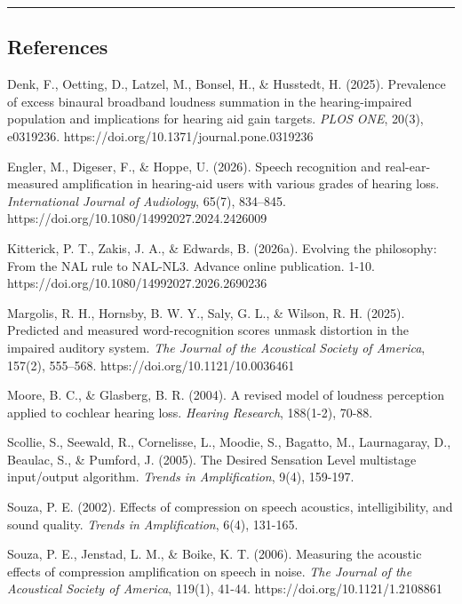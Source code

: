 \documentclass[
  12pt,
]{article}
\begin{document}
\begin{center}\rule{0.5\linewidth}{0.5pt}\end{center}

\subsection{References}\label{references-1}

Denk, F., Oetting, D., Latzel, M., Bonsel, H., \& Husstedt, H. (2025).
Prevalence of excess binaural broadband loudness summation in the
hearing-impaired population and implications for hearing aid gain
targets. \emph{PLOS ONE}, 20(3), e0319236.
https://doi.org/10.1371/journal.pone.0319236

Engler, M., Digeser, F., \& Hoppe, U. (2026). Speech recognition and
real-ear-measured amplification in hearing-aid users with various grades
of hearing loss. \emph{International Journal of Audiology}, 65(7),
834--845. https://doi.org/10.1080/14992027.2024.2426009

Kitterick, P. T., Zakis, J. A., \& Edwards, B. (2026a). Evolving the
philosophy: From the NAL rule to NAL-NL3. Advance online publication.
1-10. https://doi.org/10.1080/14992027.2026.2690236

Margolis, R. H., Hornsby, B. W. Y., Saly, G. L., \& Wilson, R. H.
(2025). Predicted and measured word-recognition scores unmask distortion
in the impaired auditory system. \emph{The Journal of the Acoustical
Society of America}, 157(2), 555--568.
https://doi.org/10.1121/10.0036461

Moore, B. C., \& Glasberg, B. R. (2004). A revised model of loudness
perception applied to cochlear hearing loss. \emph{Hearing Research},
188(1-2), 70-88.

Scollie, S., Seewald, R., Cornelisse, L., Moodie, S., Bagatto, M.,
Laurnagaray, D., Beaulac, S., \& Pumford, J. (2005). The Desired
Sensation Level multistage input/output algorithm. \emph{Trends in
Amplification}, 9(4), 159-197.

Souza, P. E. (2002). Effects of compression on speech acoustics,
intelligibility, and sound quality. \emph{Trends in Amplification},
6(4), 131-165.

Souza, P. E., Jenstad, L. M., \& Boike, K. T. (2006). Measuring the
acoustic effects of compression amplification on speech in noise.
\emph{The Journal of the Acoustical Society of America}, 119(1), 41-44.
https://doi.org/10.1121/1.2108861
\end{document}
